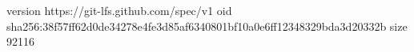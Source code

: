 version https://git-lfs.github.com/spec/v1
oid sha256:38f57ff62d0de34278e4fe3d85af6340801bf10a0e6ff12348329bda3d20332b
size 92116
